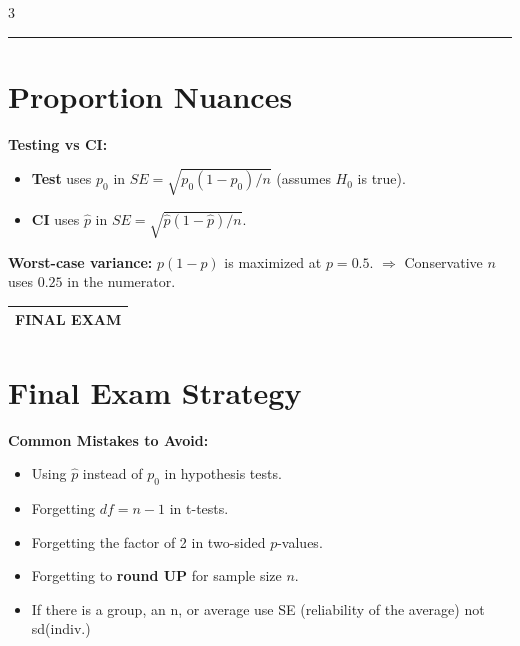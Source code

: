 \documentclass[10pt]{article}
\makeatletter
\newcommand{\termheader}[1]{%
  \par\noindent
  \begin{tabular}{@{}p{\linewidth}@{}}
    \small\bfseries\uppercase{#1} \\ \hline
  \end{tabular}
  \par\vspace{0pt}
}
\makeatother
\begin{document}
\begin{multicols}{3}
\hrule

\section*{Proportion Nuances}

\textbf{Testing vs CI:}
\begin{itemize}
    \item \textbf{Test} uses $p_0$ in $SE = \sqrt{p_0(1-p_0)/n}$ (assumes $H_0$ is true).
    \item \textbf{CI} uses $\hat{p}$ in $SE = \sqrt{\hat{p}(1-\hat{p})/n}$.
\end{itemize}

\textbf{Worst-case variance:}
$p(1-p)$ is maximized at $p = 0.5$.
$\Rightarrow$ Conservative $n$ uses $0.25$ in the numerator.
\vspace{0.5cm}
\termheader{Final Exam}
\section*{Final Exam Strategy}

\textbf{Common Mistakes to Avoid:}
\begin{itemize}
    \item Using $\hat{p}$ instead of $p_0$ in hypothesis tests.
    \item Forgetting $df = n-1$ in t-tests.
    \item Forgetting the factor of 2 in two-sided $p$-values.
    \item Forgetting to \textbf{round UP} for sample size $n$.
    \item If there is a group, an n, or average use SE (reliability of the average) not sd(indiv.)
\end{itemize}


\end{multicols}
\end{document}
